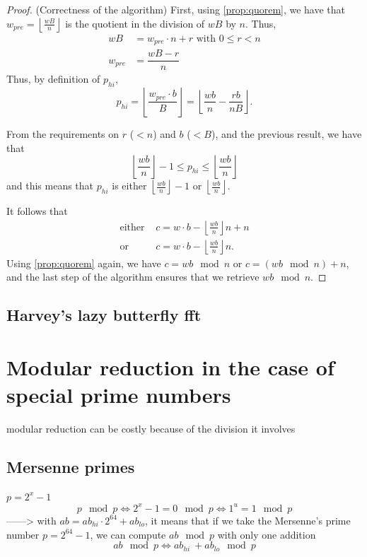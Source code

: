 \documentclass[a4paper]{article}
\begin{document}
\begin{proof} (Correctness of the algorithm)
First, using \autoref{prop:quorem}, we have that $w_{pre}= \left\lfloor\frac{wB}{n}\right\rfloor $ is the quotient in the division of $wB$ by $n$. Thus,
\begin{align*}
wB &= w_{pre}\cdot n + r \text{ with } 0 \leq r < n \\
w_{pre} &= \dfrac{wB - r}{n}
\end{align*}
Thus, by definition of $p_{hi}$,
\[
p_{hi} = \left\lfloor\frac{w_{pre}\cdot b}{B}\right\rfloor
= \left\lfloor\dfrac{wb}{n} - \dfrac{rb}{nB} \right\rfloor.
\]

From the requirements on $r$ ($<n$) and $b$ ($<B$), and the previous result, we have that
\[
\left\lfloor\dfrac{wb}{n}\right\rfloor - 1 \leq p_{hi} \leq \left\lfloor\dfrac{wb}{n}\right\rfloor
\]
and this means that $p_{hi}$ is either $\left\lfloor\frac{wb}{n}\right\rfloor - 1$ or $\left\lfloor\frac{wb}{n}\right\rfloor$.


It follows that 
\begin{align*}
\text{either } &c=w\cdot b - \left\lfloor\frac{wb}{n}\right\rfloor n + n \\
\text{or } &c=w\cdot b - \left\lfloor\frac{wb}{n}\right\rfloor n.
\end{align*}
Using \autoref{prop:quorem} again, we have $c=wb \mod n$ or $c=(wb \mod n)+n$, and the last step of the algorithm ensures that we retrieve $wb \mod n$.
\end{proof}

\subsection{Harvey's lazy butterfly fft}




\section{Modular reduction in the case of special prime numbers}

modular reduction can be costly because of the division it involves

\subsection{Mersenne primes}

$p = 2^x - 1$
\[
p \mod p \Longleftrightarrow 2^x - 1 = 0 \mod p \Longleftrightarrow 1^u = 1 \mod p
\]
------> with $ab = ab_{hi}\cdot 2^{64} + ab_{lo}$, it means that if we take the Mersenne's prime number $p = 2^{64} - 1$, we can compute $ab \mod p$ with only one addition 
\[
    ab \mod p \Longleftrightarrow ab_{hi}\ + ab_{lo} \mod p
\]
\end{document}
